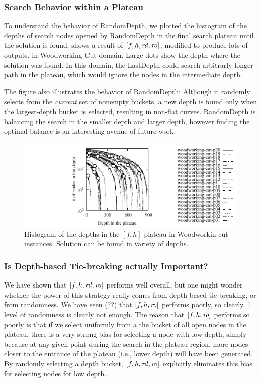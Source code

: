 \subsubsection{Search Behavior within a Plateau}

To understand the behavior of RandomDepth, we plotted the histogram of
the depths of search nodes opened by RandomDepth in the final search
plateau until the solution is found.
 shows a result of $[f,h,\mbox{\textit{rd}},\mbox{\textit{ro}}]$, modified to produce lots of outputs,
in Woodworking-Cut domain.
Large dots show the depth where the solution was found.
In this domain, the LastDepth could search arbitrarly longer path in the
plateau, which would ignore the nodes in the intermediate depth.

The figure also illustrates the behavior of RandomDepth: Although it
randomly selects from the \emph{current} set of nonempty buckets,
a new depth is found only when the largest-depth bucket is selected,
resulting in non-flat curves.
RandomDepth is balancing the search in the smaller depth and larger
depth, however finding the optimal balance is an interesting avenue of
future work.

\begin{figure}[tb]
 \centering {}
 \includegraphics{tables/aaai16-log-rd/2zerocost/depth-histogram-lmcut_rdlog1-woodworking-cut.pdf}
 \caption{Histogram of the depths in the $[f,h]$-plateau in
 Woodworkin-cut instances. Solution can be found in variety of depths.
 }
 \label{depth-histogram}
\end{figure}


\subsubsection{Is Depth-based Tie-breaking actually  Important?}
We have shown that $[f,h,\mbox{\textit{rd}},\mbox{\textit{ro}}]$ performs well overall, but
one might wonder whether the power of this strategy really comes from depth-based tie-breaking, or from randomness.
We have seen (??) that $[f,h,\mbox{\textit{ro}}]$ performs poorly, so clearly, 1 level of randomness is clearly not enough.
The reason that $[f,h,\mbox{\textit{ro}}]$ performs so poorly is that if we select uniformly from a the bucket of all open nodes in the plateau, there is a very strong bias for selecting a node with low depth, simply because at any given point during the search in the plateau region, more nodes closer to the entrance of the plateau (i.e., lower depth) will have been generated.
By randomly selecting a depth bucket, $[f,h,\mbox{\textit{rd}},\mbox{\textit{ro}}]$ explicitly eliminates this bias for selecting nodes for low depth.

